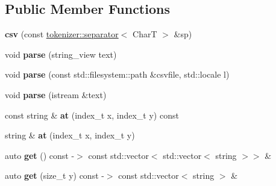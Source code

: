 \subsection*{Public Member Functions}
\begin{DoxyCompactItemize}
\item 
\mbox{\label{classouchi_1_1parser_1_1csv_af70325bf96b147f6cc45cde9e0b7811c}} 
{\bfseries csv} (const \mbox{\hyperlink{classouchi_1_1tokenizer_1_1separator}{tokenizer\+::separator}}$<$ CharT $>$ \&sp)
\item 
\mbox{\label{classouchi_1_1parser_1_1csv_ae2bad7d8fbbad46938af4de0e723a0e9}} 
void {\bfseries parse} (string\+\_\+view text)
\item 
\mbox{\label{classouchi_1_1parser_1_1csv_a41e7d321c28f998edda1aea6fc2ec0cf}} 
void {\bfseries parse} (const std\+::filesystem\+::path \&csvfile, std\+::locale l)
\item 
\mbox{\label{classouchi_1_1parser_1_1csv_acb5fadc2c82a012e13b596378641cc7f}} 
void {\bfseries parse} (istream \&text)
\item 
\mbox{\label{classouchi_1_1parser_1_1csv_a2187daae1c21d38091efd65e5c0ed5fb}} 
const string \& {\bfseries at} (index\+\_\+t x, index\+\_\+t y) const
\item 
\mbox{\label{classouchi_1_1parser_1_1csv_a237efa0620d74485e6c9db7af5d9f1a0}} 
string \& {\bfseries at} (index\+\_\+t x, index\+\_\+t y)
\item 
\mbox{\label{classouchi_1_1parser_1_1csv_a6c2ffd14f6bfd42dbfc700add83cc35b}} 
auto {\bfseries get} () const -\/$>$ const std\+::vector$<$ std\+::vector$<$ string $>$$>$ \&
\item 
\mbox{\label{classouchi_1_1parser_1_1csv_a849fb02229e6e312f436fe96a9b65343}} 
auto {\bfseries get} (size\+\_\+t y) const -\/$>$ const std\+::vector$<$ string $>$ \&
\item 
\mbox{\label{classouchi_1_1parser_1_1csv_ae95b5687ee6f8b5262cc9db4c222f0c4}} 
$$
\end{DoxyCompactItemize}
